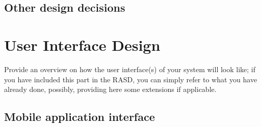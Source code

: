 \documentclass{article}
\begin{document}
	\subsection{Other design decisions}
\section{User Interface Design}Provide	an	overview	on	how	the	user	interface(s)	of	your	system	will	
look	like; if	you	 have	included	 this	 part	in	 the	 RASD,	you	 can	 simply	 refer	 to	what	you	 have	
already	done,	possibly,	providing	here	some	extensions	if	applicable.
	\subsection{Mobile application interface}
		\begin{figure}[H]
			\centering
			\begin{subfigure}[H]{0.49\linewidth}

\end{subfigure}
\end{figure}
\end{document}
